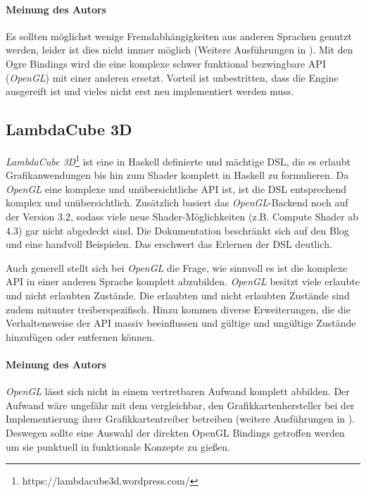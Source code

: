 \paragraph{Meinung des Autors} Es sollten möglichst wenige Fremdabhängigkeiten aus anderen Sprachen genutzt werden, leider ist dies nicht immer möglich (Weitere Ausführungen in ). Mit den Ogre Bindings wird die eine komplexe schwer funktional bezwingbare \acs{API} (\textit{OpenGL}) mit einer anderen ersetzt. Vorteil ist unbestritten, dass die Engine ausgereift ist und vieles nicht erst neu implementiert werden muss.

\subsection{LambdaCube 3D}

\textit{LambdaCube 3D}\footnote{https://lambdacube3d.wordpress.com/} ist eine in Haskell definierte und mächtige \ac{DSL}, die es erlaubt Grafikanwendungen bis hin zum Shader komplett in Haskell zu formulieren. Da \textit{OpenGL} eine komplexe und unübersichtliche \acs{API} ist, ist die \ac{DSL} entsprechend komplex und unübersichtlich. Zusätzlich basiert das \textit{OpenGL}-Backend noch auf der Version 3.2, sodass viele neue Shader-Möglichkeiten (z.B. Compute Shader ab 4.3) gar nicht abgedeckt sind. Die Dokumentation beschränkt sich auf den Blog und eine handvoll Beispielen. Das erschwert das Erlernen der DSL deutlich.

Auch generell stellt sich bei \textit{OpenGL} die Frage, wie sinnvoll es ist die komplexe \acs{API} in einer anderen Sprache komplett abzubilden. \textit{OpenGL} besitzt viele erlaubte und nicht erlaubten Zustände. Die erlaubten und nicht erlaubten Zustände sind zudem mitunter treiberspezifisch. Hinzu kommen diverse Erweiterungen, die die Verhaltensweise der \acs{API} massiv beeinflussen und gültige und ungültige Zustände hinzufügen oder entfernen können.

\paragraph{Meinung des Autors} \textit{OpenGL} lässt sich nicht in einem vertretbaren Aufwand komplett abbilden. Der Aufwand wäre ungefähr mit dem vergleichbar, den Grafikkartenhersteller bei der Implementierung ihrer Grafikkartentreiber betreiben (weitere Ausführungen in ). Deswegen sollte eine Auswahl der direkten OpenGL Bindings getroffen werden um sie punktuell in funktionale Konzepte zu gießen.



